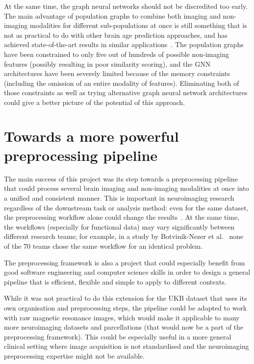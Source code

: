 At the same time, the graph neural networks should not be discredited too early. The main advantage of population graphs to combine both imaging and non-imaging modalities for different sub-populations at once is still something that is not as practical to do with other brain age prediction approaches, and has achieved state-of-the-art results in similar applications~\cite{parisot2018disease}. The population graphs have been constrained to only five out of hundreds of possible non-imaging features (possibly resulting in poor similarity scoring), and the GNN architectures have been severely limited because of the memory constraints (including the omission of an entire modality of features). Eliminating both of those constraints as well as trying alternative graph neural network architectures could give a better picture of the potential of this approach.


\section{Towards a more powerful preprocessing pipeline}
The main success of this project was its step towards a preprocessing pipeline that could process several brain imaging and non-imaging modalities at once into a unified and consistent manner. This is important in neuroimaging research regardless of the downstream task or analysis method: even for the same dataset, the preprocessing workflow alone could change the results~\cite{salehi2020there}. At the same time, the workflows (especially for functional data) may vary significantly between different research teams; for example, in a study by Botvinik-Nezer et al.~\cite{botvinik2019variability} none of the 70 teams chose the same workflow for an identical problem.

The preprocessing framework is also a project that could especially benefit from good software engineering and computer science skills in order to design a general pipeline that is efficient, flexible and simple to apply to different contexts.

While it was not practical to do this extension for the UKB dataset that uses its own organisation and preprocessing steps, the pipeline could be adapted to work with raw magnetic resonance images, which would make it applicable to many more neuroimaging datasets and parcellations (that would now be a part of the preprocessing framework). This could be especially useful in a more general clinical setting where image acquisition is not standardised and the neuroimaging preprocessing expertise might not be available.

